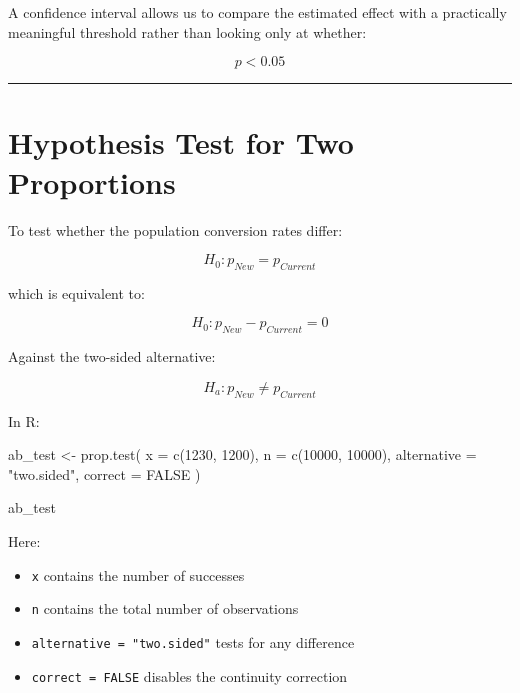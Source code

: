 \documentclass[
  letterpaper,
  DIV=11,
  numbers=noendperiod]{scrreprt}
\newenvironment{Shaded}{\begin{snugshade}}{\end{snugshade}}
\newcommand{\AttributeTok}[1]{\textcolor[rgb]{0.40,0.45,0.13}{#1}}
\newcommand{\ConstantTok}[1]{\textcolor[rgb]{0.56,0.35,0.01}{#1}}
\newcommand{\DecValTok}[1]{\textcolor[rgb]{0.68,0.00,0.00}{#1}}
\newcommand{\FunctionTok}[1]{\textcolor[rgb]{0.28,0.35,0.67}{#1}}
\newcommand{\NormalTok}[1]{\textcolor[rgb]{0.00,0.23,0.31}{#1}}
\newcommand{\OtherTok}[1]{\textcolor[rgb]{0.00,0.23,0.31}{#1}}
\newcommand{\StringTok}[1]{\textcolor[rgb]{0.13,0.47,0.30}{#1}}
\providecommand{\tightlist}{%
  \setlength{\itemsep}{0pt}\setlength{\parskip}{0pt}}
\begin{document}
A confidence interval allows us to compare the estimated effect with a
practically meaningful threshold rather than looking only at whether:

\[
p<0.05
\]

\begin{center}\rule{0.5\linewidth}{0.5pt}\end{center}


\chapter{Hypothesis Test for Two
Proportions}\label{hypothesis-test-for-two-proportions}

To test whether the population conversion rates differ:

\[
H_0:
p_{New}=p_{Current}
\]

which is equivalent to:

\[
H_0:
p_{New}-p_{Current}=0
\]

Against the two-sided alternative:

\[
H_a:
p_{New}\neq p_{Current}
\]

In R:

\begin{Shaded}
\begin{Highlighting}[]
\NormalTok{ab\_test }\OtherTok{\textless{}{-}} \FunctionTok{prop.test}\NormalTok{(}
    \AttributeTok{x =} \FunctionTok{c}\NormalTok{(}\DecValTok{1230}\NormalTok{, }\DecValTok{1200}\NormalTok{),}
    \AttributeTok{n =} \FunctionTok{c}\NormalTok{(}\DecValTok{10000}\NormalTok{, }\DecValTok{10000}\NormalTok{),}
    \AttributeTok{alternative =} \StringTok{"two.sided"}\NormalTok{,}
    \AttributeTok{correct =} \ConstantTok{FALSE}
\NormalTok{)}

\NormalTok{ab\_test}
\end{Highlighting}
\end{Shaded}

Here:

\begin{itemize}
\tightlist
\item
  \texttt{x} contains the number of successes
\item
  \texttt{n} contains the total number of observations
\item
  \texttt{alternative\ =\ "two.sided"} tests for any difference
\item
  \texttt{correct\ =\ FALSE} disables the continuity correction
\end{itemize}
\end{document}
